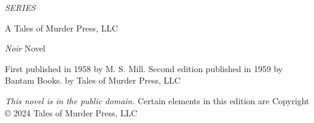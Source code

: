 \documentclass{novel}
\begin{document}
\frontmatter
\thispagestyle{empty}
\begin{parascale}[2]
\vspace*{3\nbs}
\centering{}\par
\centering{}\par
{}\par
\end{parascale}
\clearpage
\thispagestyle{empty}
\null %
\clearpage
\thispagestyle{empty}
\begin{parascale}[4]
\centering{}\par
\centering{}\par
{}\par
\end{parascale}
\vspace*{2\nbs}

\begin{parascale}[1]
\centering\textit{SERIES}\par
\vspace*{3\nbs}
\par
\end{parascale}
\vfill
\begin{parascale}[1]

A Tales of Murder Press, LLC\par
\textit{Noir} Novel\par
\end{parascale}
\clearpage
\thispagestyle{empty}
\null\vfill
{} First published in 1958 by M. S. Mill. Second edition published in 1959 by Bantam Books. by Tales of Murder Press, LLC\par
\null\null
{}\par
\null\null
\vfill
\begin{adjustwidth}{3em}{3em}
\textit{This novel is in the public domain.} Certain \mbox{elements} in this edition are Copyright © 2024 Tales of Murder Press, LLC
\end{adjustwidth}
\clearpage
\thispagestyle{empty}
\clearpage %
\thispagestyle{empty}
\begin{toc}[0.5]{0em}
{\centering{}\par}
\null



\end{toc}
\clearpage
\end{document}
